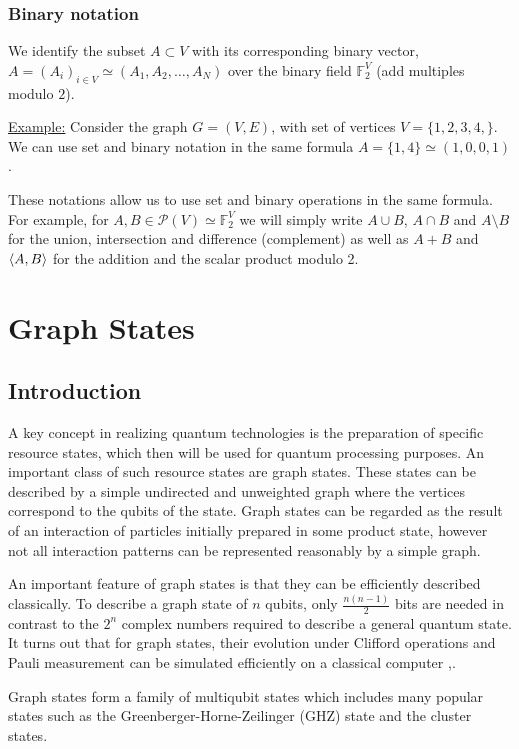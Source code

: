 \documentclass[10pt,a4paper]{book}
\numberwithin{equation}{chapter}
\numberwithin{figure}{chapter}
\numberwithin{table}{chapter}
\begin{document}
\subsection{Binary notation}
We identify the subset $A \subset V$ with its corresponding binary vector, $A=(A_i)_{i \in V}\simeq(A_{1}, A_{2},\ldots ,A_N)$ over the binary field $\mathbb{F}^{V}_2$ (add multiples modulo $2$).

\underline{Example:} Consider the graph $G=(V,E)$, with set of vertices $V=\lbrace 1,2,3,4, \rbrace$. We can use set and binary notation in the same formula $A=\lbrace 1,4 \rbrace\simeq (1,0,0,1)$.

These notations allow us to use set and binary operations in the same formula. For example, for $A,B \in \mathcal{P}(V)\simeq \mathbb{F}^{V}_2$ we will simply write $A \cup B$, $A \cap B$ and $A \setminus B$ for the union, intersection and difference (complement) as well as $A+B$ and $\braket{A,B}$ for the addition and the scalar product modulo 2.



\chapter{Graph States}\label{chap:Graphs states}
\section{Introduction}
A key concept in realizing quantum technologies is the preparation of specific resource states, which then will be used for quantum processing purposes. An important class of such resource states are graph states. These states can be described by a simple undirected and unweighted graph where the vertices correspond to the qubits of the state. Graph states can be regarded as the result of an interaction of particles initially prepared in some product state, however not all interaction patterns can be represented reasonably by a simple graph.

An important feature of graph states is that they can be efficiently described classically. To describe a graph state of $n$ qubits, only $\frac{n(n−1)}{2}$ bits are needed in contrast to the $2^n$ complex numbers required to describe a general quantum state. It turns out that for graph states, their evolution under Clifford operations and Pauli measurement can be simulated efficiently on a classical computer \cite{NielsenChuang},\cite{Vidal}.

Graph states form a family of multiqubit states which includes many popular states such as the Greenberger-Horne-Zeilinger (GHZ) state and the cluster states.
\end{document}
